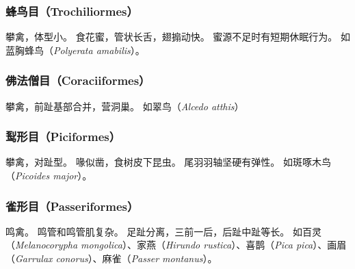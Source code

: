 \documentclass[11pt]{article}
\begin{document}
\subsubsection{蜂鸟目（Trochiliormes）}
攀禽，体型小。
食花蜜，管状长舌，翅搧动快。
蜜源不足时有短期休眠行为。
如蓝胸蜂鸟（\textit{Polyerata amabilis}）。

\subsubsection{佛法僧目（Coraciiformes）}
攀禽，前趾基部合并，营洞巢。
如翠鸟（\textit{Alcedo atthis}）

\subsubsection{䴕形目（Piciformes）}
攀禽，对趾型。
喙似凿，食树皮下昆虫。
尾羽羽轴坚硬有弹性。
如斑啄木鸟（\textit{Picoides major}）。

\subsubsection{雀形目（Passeriformes）}
鸣禽。
鸣管和鸣管肌复杂。
足趾分离，三前一后，后趾中趾等长。
如百灵（\textit{Melanocorypha mongolica}）、家燕（\textit{Hirundo rustica}）、喜鹊（\textit{Pica pica}）、画眉（\textit{Garrulax conorus}）、麻雀（\textit{Passer montanus}）。
\end{document}
